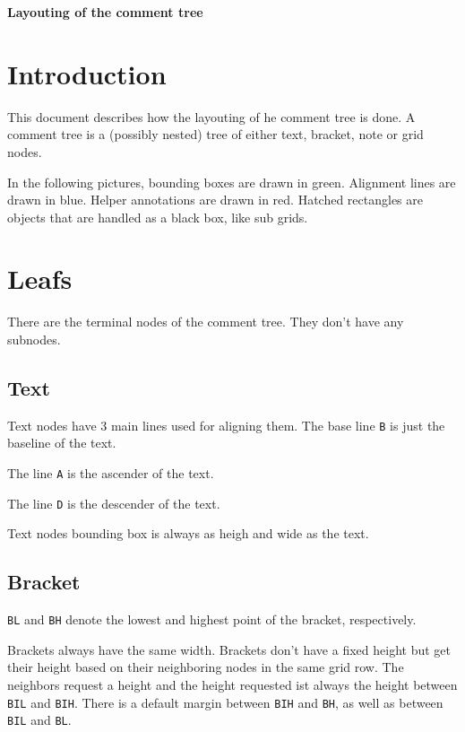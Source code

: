 \documentclass[a4paper]{article}
\begin{document}
{
  \Huge
  \centering
  \textbf{Layouting of the comment tree}
}

\vspace{2cm}

\section{Introduction}

This document describes how the layouting of he comment tree is done. A comment
tree is a (possibly nested) tree of either text, bracket, note or grid nodes.

In the following pictures, bounding boxes are drawn in green. Alignment lines
are drawn in blue. Helper annotations are drawn in red. Hatched rectangles
are objects that are handled as a black box, like sub grids.

\section{Leafs}

There are the terminal nodes of the comment tree. They don't have any
subnodes.

\subsection{Text}



Text nodes have 3 main lines used for aligning them. The base line \texttt{B} is just
the baseline of the text.

The line \texttt{A} is the ascender of the text.

The line \texttt{D} is the descender of the text.

Text nodes bounding box is always as heigh and wide as the text.


\subsection{Bracket}



\texttt{BL} and \texttt{BH} denote the lowest and highest point of the bracket, respectively.

Brackets always have the same width. Brackets don't have a fixed height but get
their height based on their neighboring nodes in the same grid row. The
neighbors request a height and the height requested ist always the height
between \texttt{BIL} and \texttt{BIH}. There is a default margin between
\texttt{BIH} and \texttt{BH}, as well as between \texttt{BIL} and \texttt{BL}.
\end{document}
